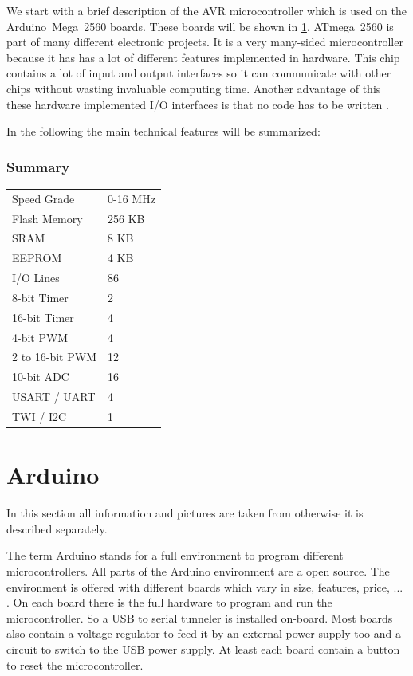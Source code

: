 We start with a brief description of the AVR microcontroller which is used on the Arduino~Mega~2560 boards.
These boards will be shown in \ref{sec:arduino}.
ATmega~2560 is part of many different electronic projects.
It is a very many-sided microcontroller because it has has a lot of different features implemented in hardware.
This chip contains a lot of input and output interfaces so it can communicate with other chips without wasting invaluable computing time.
Another advantage of this these hardware implemented I/O interfaces is that no code has to be written .

In the following the main technical features will be summarized:


\subsubsection{Summary} \label{sec:atmega2560Summary}
\begin{tabular}{ll}
Speed Grade	& 0-16 MHz	\\
Flash Memory	& 256 KB	\\
SRAM			& 8 KB	\\
EEPROM		& 4 KB	\\
I/O Lines		& 86		\\
8-bit Timer		& 2		\\
16-bit Timer	& 4		\\
4-bit PWM		& 4		\\
2 to 16-bit PWM	& 12		\\
10-bit ADC		& 16		\\
USART / UART	& 4		\\
TWI / I2C		& 1		\\
\end{tabular}


\section{Arduino} \label {sec:arduino}
In this section all information and pictures are taken from \cite{web:arduino} otherwise it is described separately.

The term Arduino stands for a full environment to program different microcontrollers.
All parts of the Arduino environment are a open source. 
The environment is offered with different boards which vary in size, features, price, ... .
On each board there is the full hardware to program and run the microcontroller.
So a USB to serial tunneler is installed on-board.
Most boards also contain a voltage regulator to feed it by an external power supply too and a circuit to switch to the USB power supply.
At least each board contain a button to reset the microcontroller.

